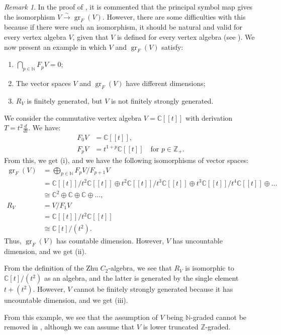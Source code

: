 \documentclass[a4paper, 12pt, reqno]{amsart}
\theoremstyle{remark}
\newtheorem{remark}[theorem]{Remark}
\DeclareMathOperator{\gr}{gr}
\begin{document}
\begin{remark}
  \label{rmk:46}
  In the proof of \cite[Corollary 2.6.2]{arakawa_remark_2012}, it is commented that the principal symbol map gives the isomorphism $V \xrightarrow{\sim} \gr_F(V)$.
  However, there are some difficulties with this because if there were such an isomorphism, it should be natural and valid for every vertex algebra $V$, given that $V$ is defined for every vertex algebra (see ).
  We now present an example in which $V$ and $\gr_F(V)$ satisfy:
  \begin{enumerate}
  \item $\bigcap_{p \in \mathbb{N}}F_pV = 0$;
  \item The vector spaces $V$ and $\gr_F(V)$ have different dimensions;
  \item $R_V$ is finitely generated, but $V$ is not finitely strongly generated.
  \end{enumerate}
  We consider the commutative vertex algebra $V = \mathbb{C}[[t]]$ with derivation $T = t^2\frac{d}{dt}$.
  We have:
  \begin{align*}
    F_0V &= \mathbb{C}[[t]], \\
    F_pV &= t^{1 + p}\mathbb{C}[[t]] \quad \text{for $p \in \mathbb{Z}_+$}.
  \end{align*}
  From this, we get (i), and we have the following isomorphisms of vector spaces:
  \begin{align*}
    \gr_F(V) &= \bigoplus_{p \in \mathbb{N}}F_pV/F_{p + 1}V \\
             &= \mathbb{C}[[t]]/t^2\mathbb{C}[[t]] \oplus t^2\mathbb{C}[[t]]/t^3\mathbb{C}[[t]] \oplus t^3\mathbb{C}[[t]]/t^4\mathbb{C}[[t]] \oplus \dots \\
             &\cong \mathbb{C}^2 \oplus \mathbb{C} \oplus \mathbb{C} \oplus \dots, \\
    R_V &= V/F_1V \\
             &= \mathbb{C}[[t]]/t^2\mathbb{C}[[t]] \\
             &\cong \mathbb{C}[t]/(t^2).
  \end{align*}
  Thus, $\gr_F(V)$ has countable dimension.
  However, $V$ has uncountable dimension, and we get (ii).

  From the definition of the Zhu $C_2$-algebra, we see that $R_V$ is isomorphic to $\mathbb{C}[t]/(t^2)$ as an algebra, and the latter is generated by the single element $t + (t^2)$.
  However, $V$ cannot be finitely strongly generated because it has uncountable dimension, and we get (iii).

  From this example, we see that the assumption of $V$ being $\mathbb{N}$-graded cannot be removed in , although we can assume that $V$ is lower truncated $\mathbb{Z}$-graded.
\end{remark}
\end{document}
